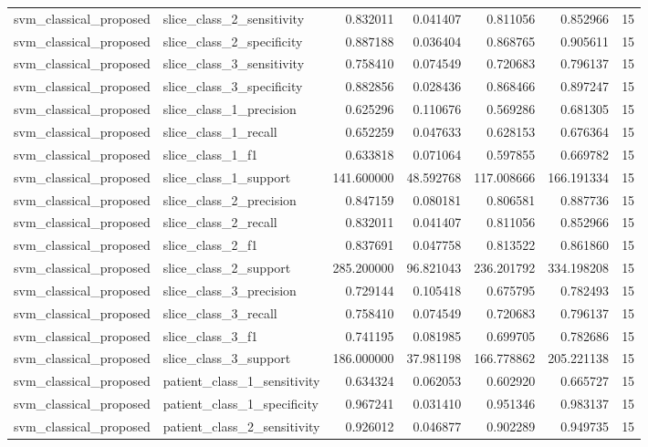 \begin{tabular}{llrrrrr}
svm_classical_proposed & slice_class_2_sensitivity & 0.832011 & 0.041407 & 0.811056 & 0.852966 & 15 \\
svm_classical_proposed & slice_class_2_specificity & 0.887188 & 0.036404 & 0.868765 & 0.905611 & 15 \\
svm_classical_proposed & slice_class_3_sensitivity & 0.758410 & 0.074549 & 0.720683 & 0.796137 & 15 \\
svm_classical_proposed & slice_class_3_specificity & 0.882856 & 0.028436 & 0.868466 & 0.897247 & 15 \\
svm_classical_proposed & slice_class_1_precision & 0.625296 & 0.110676 & 0.569286 & 0.681305 & 15 \\
svm_classical_proposed & slice_class_1_recall & 0.652259 & 0.047633 & 0.628153 & 0.676364 & 15 \\
svm_classical_proposed & slice_class_1_f1 & 0.633818 & 0.071064 & 0.597855 & 0.669782 & 15 \\
svm_classical_proposed & slice_class_1_support & 141.600000 & 48.592768 & 117.008666 & 166.191334 & 15 \\
svm_classical_proposed & slice_class_2_precision & 0.847159 & 0.080181 & 0.806581 & 0.887736 & 15 \\
svm_classical_proposed & slice_class_2_recall & 0.832011 & 0.041407 & 0.811056 & 0.852966 & 15 \\
svm_classical_proposed & slice_class_2_f1 & 0.837691 & 0.047758 & 0.813522 & 0.861860 & 15 \\
svm_classical_proposed & slice_class_2_support & 285.200000 & 96.821043 & 236.201792 & 334.198208 & 15 \\
svm_classical_proposed & slice_class_3_precision & 0.729144 & 0.105418 & 0.675795 & 0.782493 & 15 \\
svm_classical_proposed & slice_class_3_recall & 0.758410 & 0.074549 & 0.720683 & 0.796137 & 15 \\
svm_classical_proposed & slice_class_3_f1 & 0.741195 & 0.081985 & 0.699705 & 0.782686 & 15 \\
svm_classical_proposed & slice_class_3_support & 186.000000 & 37.981198 & 166.778862 & 205.221138 & 15 \\
svm_classical_proposed & patient_class_1_sensitivity & 0.634324 & 0.062053 & 0.602920 & 0.665727 & 15 \\
svm_classical_proposed & patient_class_1_specificity & 0.967241 & 0.031410 & 0.951346 & 0.983137 & 15 \\
svm_classical_proposed & patient_class_2_sensitivity & 0.926012 & 0.046877 & 0.902289 & 0.949735 & 15 \\

\end{tabular}
